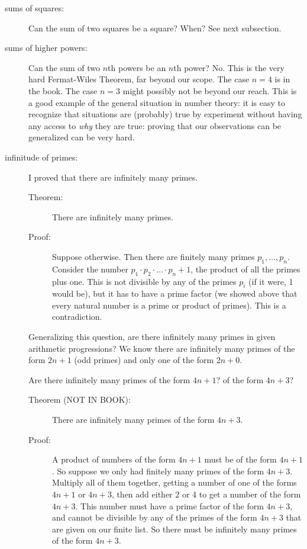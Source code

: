 \documentclass[12pt]{article}
\begin{document}
\begin{description}

\item[sums of squares:]  Can the sum of two squares be a square?   When?   See next subsection.

\item[sums of higher powers:]  Can the sum of two $n$th powers be an $n$th power?  No.   This is the very hard Fermat-Wiles Theorem, far beyond our scope.   The case $n=4$ is in the book.   The case $n=3$ might possibly not be beyond our reach.  This is a good example of the general situation in number theory:  it is easy to recognize that situations are (probably) true by experiment without having any access to {\em why\/} they are true:  proving that our observations can be generalized can be very hard.

\item[infinitude of primes:]  I proved that there are infinitely many primes.

\begin{description}

\item[Theorem:]  There are infinitely many primes.

\item[Proof:]  Suppose otherwise.   Then there are finitely many primes $p_1,\ldots,p_n$.   Consider the number $p_1\cdot p_2 \cdot \ldots \cdot p_n+1$, the product of all the primes plus one.   This is not divisible by any of the primes $p_i$ (if it were, 
1 would be), but it has to have a prime factor (we showed above that every natural number is a prime or product of primes).   This is a contradiction.

\end{description}

Generalizing this question, are there infinitely many primes in given arithmetic progressions?  We know there are infinitely many primes of the form $2n+1$ (odd primes) and only one of the form $2n+0$.

Are there infinitely many primes of the form $4n+1$?  of the form $4n+3$?

\begin{description}

\item[Theorem (NOT IN BOOK):]  There are infinitely many primes of the form $4n+3$.

\item[Proof:]   A product of numbers of the form $4n+1$ must be of the form $4n+1$.   So suppose we only had finitely many primes of the form $4n+3$.   Multiply all of them together, getting a number of one of the forms $4n+1$ or $4n+3$, then add either 2 or 4  to get a number of the form $4n+3$.
This number must have a prime factor of the form $4n+3$, and cannot be divisible by any of the primes of the form $4n+3$ that are given on our finite list.   So there must be infinitely many primes of the form $4n+3$.



\end{description}
\end{description}
\end{document}
